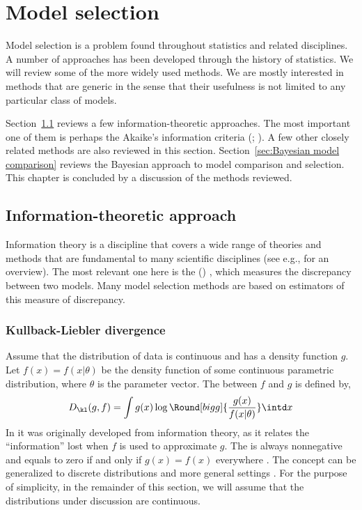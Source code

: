 \chapter{Model selection}
\label{cha:Model selection}

Model selection is a problem found throughout statistics and related
disciplines. A number of approaches has been developed through the history of
statistics. We will review some of the more widely used methods. We are
mostly interested in methods that are generic in the sense that their
usefulness is not limited to any particular class of models.

Section~\ref{sec:Information theoretic approach} reviews a few
information-theoretic approaches. The most important one of them is perhaps
the Akaike's information criteria (\aic; \cite{Akaike:1973uc,Akaike:1974ih}).
A few other closely related methods are also reviewed in this section.
Section~\ref{sec:Bayesian model comparison} reviews the Bayesian approach to
model comparison and selection. This chapter is concluded by a discussion of
the methods reviewed.

\section{Information-theoretic approach}
\label{sec:Information theoretic approach}

Information theory is a discipline that covers a wide range of theories and
methods that are fundamental to many scientific disciplines (see e.g.,
\cite{Cover:1991vx} for an overview). The most relevant one here is the
\kldfull (\kld) \cite{Kullback:1951va}, which measures the discrepancy
between two models. Many model selection methods are based on estimators of
this measure of discrepancy.

\subsection{Kullback-Liebler divergence}
\label{sub:Kullback-Liebler divergence}

Assume that the distribution of data is continuous and has a density function
$g$. Let $f(x) = f(x|\theta)$ be the density function of some continuous
parametric distribution, where $\theta$ is the parameter vector. The \kld
between $f$ and $g$ is defined by,
\begin{equation}
  D_{\kl}(g,f) = \int g(x)\log\Round[bigg]{\frac{g(x)}{f(x|\theta)}}\intd x
  \label{eq:kl}
\end{equation}
In \cite{Kullback:1951va} it was originally developed from information
theory, as it relates the ``information'' lost when $f$ is used to
approximate $g$. The \kld is always nonnegative and equals to zero if and
only if $g(x) = f(x)$ everywhere \cite[][sec.~6.8]{Burnham:2002wc}. The
concept can be generalized to discrete distributions and more general
settings \cite[][sec.~2.1.3]{Burnham:2002wc}. For the purpose of simplicity,
in the remainder of this section, we will assume that the distributions under
discussion are continuous.


